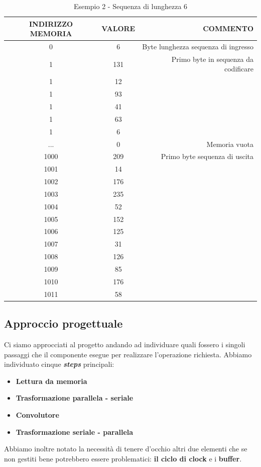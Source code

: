 \documentclass[12pt]{article} %
\begin{document}
			\begin{table}[h!]
				\centering
				\begin{tabular}{ccr}
					\toprule
					INDIRIZZO MEMORIA & VALORE & COMMENTO \\
					\midrule
					0 & 6 & Byte lunghezza sequenza di ingresso \\
					\midrule
					1 & 131 & Primo byte in sequenza da codificare \\
					\midrule
					1 & 12 &  \\
					\midrule
					1 & 93 &  \\
					\midrule
					1 & 41 &  \\
					\midrule
					1 & 63 &  \\
					\midrule
					1 & 6 &  \\
					\midrule
					... &   0 & Memoria vuota \\
					\midrule
					1000 & 209 & Primo byte sequenza di uscita \\
					\midrule
					1001 & 14 & \\
					\midrule
					1002 &  176 & \\
					\midrule
					1003 &  235 & \\
					\midrule
					1004 & 52 & \\
					\midrule
					1005 & 152 &  \\
					\midrule
					1006 & 125 &  \\
					\midrule
					1007 & 31 &  \\
					\midrule
					1008 & 126 &  \\
					\midrule
					1009 & 85 &  \\
					\midrule
					1010 & 176 &  \\
					\midrule
					1011 & 58 &  \\
					\bottomrule
				\end{tabular}
				\caption{Esempio 2 - Sequenza di lunghezza 6}
				\label{tab:2}
			\end{table}
			\newpage
		\subsection{Approccio progettuale}
			Ci siamo approcciati al progetto andando ad individuare quali fossero i singoli passaggi 
			che il componente esegue per realizzare l'operazione richiesta. 
			Abbiamo individuato cinque \textit{\textbf{steps}} principali:
			\begin{itemize}
				\item \textbf{Lettura da memoria}
				\item \textbf{Trasformazione parallela - seriale}
				\item \textbf{Convolutore}
				\item \textbf{Trasformazione seriale - parallela}
			\end{itemize}
			Abbiamo inoltre notato la necessità di tenere d'occhio altri due elementi 
			che se non gestiti bene potrebbero essere problematici: \textbf{il ciclo di clock} e i \textbf{buffer}. 
			
\end{document}
